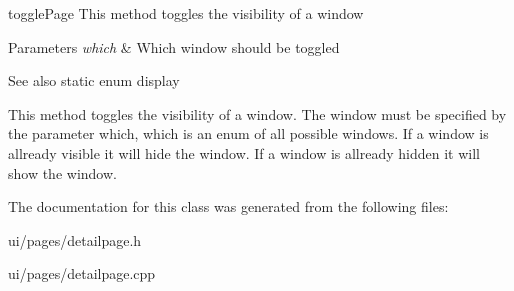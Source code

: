 toggle\+Page This method toggles the visibility of a window 


\begin{DoxyParams}{Parameters}
{\em which} & Which window should be toggled \\
\hline
\end{DoxyParams}
\begin{DoxySeeAlso}{See also}
static enum display
\end{DoxySeeAlso}
This method toggles the visibility of a window. The window must be specified by the parameter which, which is an enum of all possible windows. If a window is allready visible it will hide the window. If a window is allready hidden it will show the window. 

The documentation for this class was generated from the following files\+:\begin{DoxyCompactItemize}
\item 
ui/pages/detailpage.\+h\item 
ui/pages/detailpage.\+cpp\end{DoxyCompactItemize}
